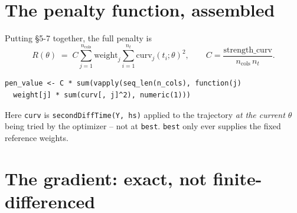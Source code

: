 \documentclass[11pt]{article}
\newcommand{\code}[1]{\texttt{#1}}
\begin{document}
\section{The penalty function, assembled}

Putting \S5-7 together, the full penalty is
\begin{equation}
  R(\theta) \;=\; C \sum_{j=1}^{n_{\mathrm{cols}}} \mathrm{weight}_j
  \sum_{i=1}^{n_t} \mathrm{curv}_j(t_i;\theta)^2,
  \qquad C = \frac{\mathrm{strength\_curv}}{n_{\mathrm{cols}}\, n_t}.
  \label{eq:penalty}
\end{equation}
\begin{lstlisting}
pen_value <- C * sum(vapply(seq_len(n_cols), function(j)
  weight[j] * sum(curv[, j]^2), numeric(1)))
\end{lstlisting}
Here \code{curv} is \code{secondDiffTime(Y, hs)} applied to the trajectory
\emph{at the current $\theta$} being tried by the optimizer -- not at
\code{best}. \code{best} only ever supplies the fixed reference weights.

\section{The gradient: exact, not finite-differenced}
\end{document}

